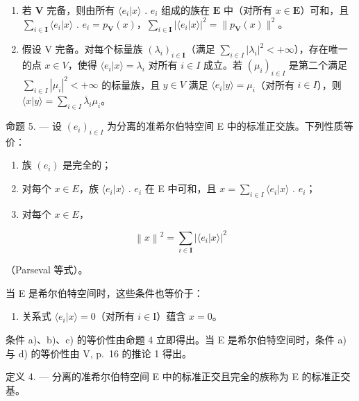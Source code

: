 \begin{enumerate}
\def\labelenumi{\arabic{enumi})}
\setcounter{enumi}{1}
\item
  若 \(\mathbf{V}\) 完备，则由所有 \(\langle e_i|x\rangle\) . \(e_i\) 组成的族在 \(\mathbf{E}\) 中（对所有 \(x\in\mathbf{E}\)）可和，且 \(\sum_{i\in\mathbf{I}}\langle e_i|x\rangle\) . \(e_i=p_{\mathbf{V}}(x)\)，\(\sum_{i\in\mathbf{I}}|\langle e_i|x\rangle|^2=\|p_{\mathbf{V}}(x)\|^2\)。
\item
  假设 V 完备。对每个标量族 \((\lambda_{i})_{i\in\mathbf{I}}\)（满足 \(\sum_{i\in I}|\lambda_{i}|^{2}<+\infty\)），存在唯一的点 \(x\in V\)，使得 \(\langle e_{i}|x\rangle=\lambda_{i}\) 对所有 \(i\in I\) 成立。若 \((\mu_{i})_{i\in I}\) 是第二个满足 \(\sum_{i\in I}\left|\mu_{i}\right|^{2}<+\infty\) 的标量族，且 \(y\in V\) 满足 \(\langle e_{i}|y\rangle=\mu_{i}\)（对所有 \(i\in I\)），则 \(\langle x|y\rangle=\sum_{i\in I}\overline{\lambda}_{i}\mu_{i}\)。
\end{enumerate}

命题 5. --- 设 \((e_i)_{i \in I}\) 为分离的准希尔伯特空间 E 中的标准正交族。下列性质等价：

\begin{enumerate}
\def\labelenumi{\alph{enumi})}
\item
  族 \((e_i)\) 是完全的；
\item
  对每个 \(x \in E\)，族 \(\langle e_{i}|x\rangle\) . \(e_{i}\) 在 E 中可和，且 \(x = \sum_{i \in I} \langle e_{i}|x\rangle\) . \(e_{i}\)；
\item
  对每个 \(x \in E\)，
\end{enumerate}

\[
\left\| x \right\| ^ {2} = \sum_ {i \in \mathbf {I}} \left| \langle e _ {i} | x \rangle \right| ^ {2}\tag{2}
\]

（Parseval 等式）。

当 E 是希尔伯特空间时，这些条件也等价于：

\begin{enumerate}
\def\labelenumi{\alph{enumi})}
\setcounter{enumi}{3}
\tightlist
\item
  关系式 \(\langle e_i|x\rangle = 0\)（对所有 \(i\in \mathrm{I}\)）蕴含 \(x = 0\)。
\end{enumerate}

条件 a)、b)、c) 的等价性由命题 4 立即得出。当 E 是希尔伯特空间时，条件 a) 与 d) 的等价性由 V, p.~16 的推论 1 得出。

定义 4. --- 分离的准希尔伯特空间 E 中的标准正交且完全的族称为 E 的标准正交基。

